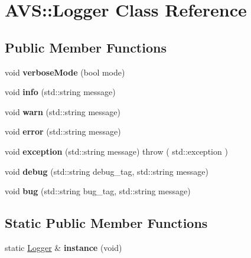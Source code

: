 \hypertarget{classAVS_1_1Logger}{}\section{A\+VS\+:\+:Logger Class Reference}
\label{classAVS_1_1Logger}
\subsection*{Public Member Functions}
\begin{DoxyCompactItemize}
\item 
\mbox{\label{classAVS_1_1Logger_a3b9c3d7f8de3545c360b8dabebf425d8}} 
void {\bfseries verbose\+Mode} (bool mode)
\item 
\mbox{\label{classAVS_1_1Logger_a17dd1302a17b15291d750d6ad3a75fa2}} 
void {\bfseries info} (std\+::string message)
\item 
\mbox{\label{classAVS_1_1Logger_aeb6908a6fe3de2039da64629fa132a21}} 
void {\bfseries warn} (std\+::string message)
\item 
\mbox{\label{classAVS_1_1Logger_ade9e0898dc8cefe41ca72fa20f1a1706}} 
void {\bfseries error} (std\+::string message)
\item 
\mbox{\label{classAVS_1_1Logger_a69fd78ea1ecb9dad9e04937963c0cb36}} 
void {\bfseries exception} (std\+::string message)  throw ( std\+::exception )
\item 
\mbox{\label{classAVS_1_1Logger_ae027fa1cd279cd77f8edab61177e6306}} 
void {\bfseries debug} (std\+::string debug\+\_\+tag, std\+::string message)
\item 
\mbox{\label{classAVS_1_1Logger_aee4ed8b6fe0b4f4c5b20c26117a1227c}} 
void {\bfseries bug} (std\+::string bug\+\_\+tag, std\+::string message)
\end{DoxyCompactItemize}
\subsection*{Static Public Member Functions}
\begin{DoxyCompactItemize}
\item 
\mbox{\label{classAVS_1_1Logger_a8d6c4492678906d1abf34baf0e515502}} 
static \hyperlink{classAVS_1_1Logger}{Logger} \& {\bfseries instance} (void)
\end{DoxyCompactItemize}
